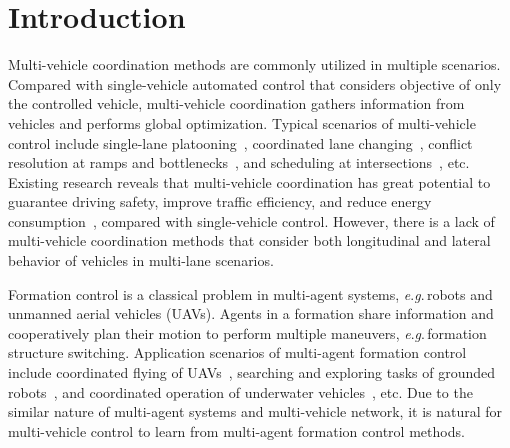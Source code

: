 \documentclass[journal]{IEEEtranTIE}
\newcommand{\eg}{\textit{e}.\textit{g}.}
\begin{document}
\markboth{}%
{}



%
\section{Introduction}
\label{intro}
%


Multi-vehicle coordination methods are commonly utilized in multiple scenarios. Compared with single-vehicle automated control that considers objective of only the controlled vehicle, multi-vehicle coordination gathers information from vehicles and performs global optimization. Typical scenarios of multi-vehicle control include single-lane platooning~\cite{naus2010string,zheng2016distributed,wang2020controllability}, coordinated lane changing~\cite{wu2020emergency,luo2016dynamic,li2018consensus}, conflict resolution at ramps and bottlenecks~\cite{kato2002vehicle,ntousakis2016optimal,xu2020bi}, and scheduling at intersections~\cite{malikopoulos2018decentralized,bian2019cooperation,yu2019corridor}, etc. Existing research reveals that multi-vehicle coordination has great potential to guarantee driving safety, improve traffic efficiency, and reduce energy consumption~\cite{cai2021formationb,cai2021formationc,chen2021mixed}, compared with single-vehicle control. However, there is a lack of multi-vehicle coordination methods that consider both longitudinal and lateral behavior of vehicles in multi-lane scenarios. 



Formation control is a classical problem in multi-agent systems, \eg\,robots and unmanned aerial vehicles (UAVs). Agents in a formation share information and cooperatively plan their motion to perform multiple maneuvers, \eg\,formation structure switching. Application scenarios of multi-agent formation control include coordinated flying of UAVs~\cite{dong2014time}, searching and exploring tasks of grounded robots~\cite{cheah2009region,macdonald2011multi}, and coordinated operation of underwater vehicles~\cite{li2016receding}, etc. Due to the similar nature of multi-agent systems and multi-vehicle network, it is natural for multi-vehicle control to learn from multi-agent formation control methods.
\end{document}
